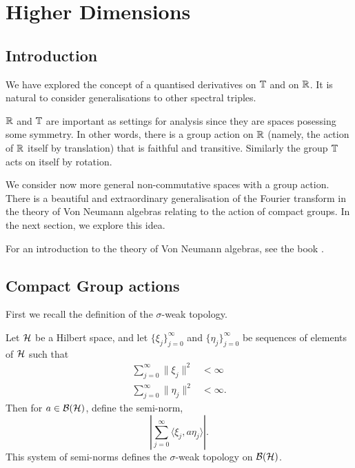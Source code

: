 
\chapter{Higher Dimensions} %

\label{HigherDimensions} %


\section{Introduction}
We have explored the concept of a quantised derivatives on $\mathbb{T}$ and on $\mathbb{R}$.
It is natural to consider generalisations to other spectral triples. 

$\mathbb{R}$ and $\mathbb{T}$ are important as settings for analysis since they
are spaces posessing some symmetry. In other words, there is a group
action on $\mathbb{R}$ (namely, the action of $\mathbb{R}$ itself by translation)
that is faithful and transitive. Similarly the group $\mathbb{T}$
acts on itself by rotation.

We consider now more general non-commutative spaces with a group
action. There is a beautiful and extraordinary generalisation of the Fourier
transform in the theory of Von Neumann algebras relating
to the action of compact groups. In the next section, we explore this idea.

For an introduction to the theory of Von Neumann algebras, see the book \cite{Sakai1971}.

\section{Compact Group actions}

First we recall the definition of the $\sigma$-weak topology.

\begin{definition}
    Let $\mathcal{H}$ be a Hilbert space, and let $\{\xi_j\}_{j = 0}^\infty$
    and $\{\eta_j\}_{j=0}^\infty$ be sequences of elements of $\mathcal{H}$
    such that 
    \begin{align}
        \sum_{j=0}^\infty \|\xi_j\|^2 &< \infty\\
        \sum_{j=0}^\infty \|\eta_j\|^2 &< \infty.
    \end{align}
    Then for $a \in \mathcal{B}(\mathcal{H})$, define the semi-norm,
    \begin{equation}
        \left| \sum_{j=0}^\infty \langle \xi_j,a\eta_j\rangle\right|.
    \end{equation}
    This system of semi-norms defines the $\sigma$-weak topology
    on $\mathcal{B}(\mathcal{H})$.
\end{definition}



